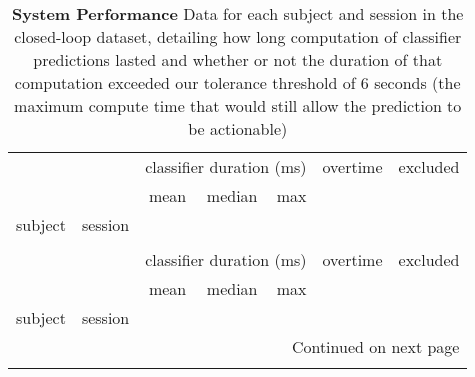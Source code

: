 \begin{longtable}{llrrrrl}
\caption{
\textbf{System Performance} Data for each subject and session in the
closed-loop dataset, detailing how long computation of classifier predictions
lasted and whether or not the duration of that computation exceeded our tolerance
threshold of 6 seconds (the maximum compute time that would still allow the
prediction to be actionable)
}
\label{system_perfomance}\\
\toprule
       &   & \multicolumn{3}{l}{classifier duration (ms)} & overtime & excluded \\
       &   &                     mean & median &     max & \multicolumn{2}{l}{} \\
subject & session &                          &        &         &          &          \\
\midrule
\endfirsthead
\\
\toprule
       &   & \multicolumn{3}{l}{classifier duration (ms)} & overtime & excluded \\
       &   &                     mean & median &     max & \multicolumn{2}{l}{} \\
subject & session &                          &        &         &          &          \\
\midrule
\endhead
\midrule
\multicolumn{7}{r}{{Continued on next page}} \\
\midrule
\endfoot


\end{longtable}
